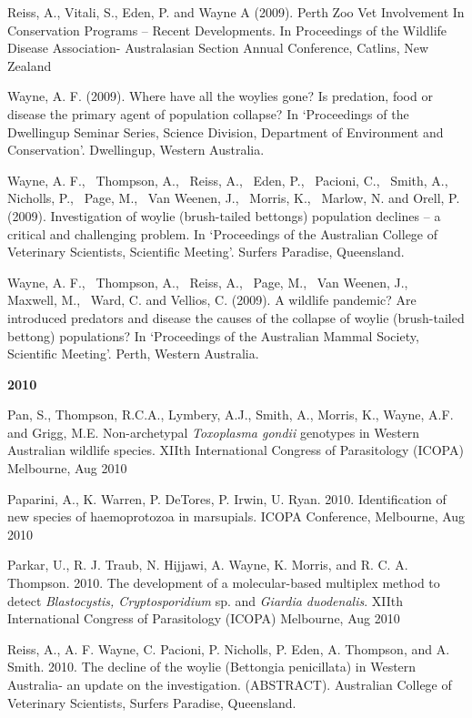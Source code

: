\documentclass[version=last,
    paper=a4,                               %
    10pt,                                   %
    dvipsnames,
    oneside,                              %
    headings=openany,                       %
    open=any,
    BCOR=7mm,                               %
    DIV=15,     %
]{scrbook}
\begin{document}
Reiss, A., Vitali, S., Eden, P. and Wayne A (2009). Perth Zoo Vet
Involvement In Conservation Programs -- Recent Developments. In
Proceedings of the Wildlife Disease Association- Australasian Section
Annual Conference, Catlins, New Zealand

Wayne, A. F. (2009). Where have all the woylies gone? Is predation, food
or disease the primary agent of population collapse? In `Proceedings of
the Dwellingup Seminar Series, Science Division, Department of
Environment and Conservation'. Dwellingup, Western Australia.

Wayne, A. F.,~ Thompson, A.,~ Reiss, A.,~ Eden, P.,~ Pacioni, C.,~
Smith, A.,~ Nicholls, P.,~ Page, M.,~ Van Weenen, J.,~ Morris, K.,~
Marlow, N. and Orell, P. (2009). Investigation of woylie (brush-tailed
bettongs) population declines -- a critical and challenging problem. In
`Proceedings of the Australian College of Veterinary Scientists,
Scientific Meeting'. Surfers Paradise, Queensland.

Wayne, A. F.,~ Thompson, A.,~ Reiss, A.,~ Page, M.,~ Van Weenen, J.,~
Maxwell, M.,~ Ward, C. and Vellios, C. (2009). A wildlife pandemic? Are
introduced predators and disease the causes of the collapse of woylie
(brush-tailed bettong) populations? In `Proceedings of the Australian
Mammal Society, Scientific Meeting'. Perth, Western Australia.

\textbf{2010}

Pan, S., Thompson, R.C.A., Lymbery, A.J., Smith, A., Morris, K., Wayne,
A.F. and Grigg, M.E. Non-archetypal \emph{Toxoplasma gondii} genotypes
in Western Australian wildlife species. XIIth International Congress of
Parasitology (ICOPA) Melbourne, Aug 2010

Paparini, A., K. Warren, P. DeTores, P. Irwin, U. Ryan. 2010.
Identification of new species of haemoprotozoa in marsupials. ICOPA
Conference, Melbourne, Aug 2010

Parkar, U., R. J. Traub, N. Hijjawi, A. Wayne, K. Morris, and R. C. A.
Thompson. 2010. The development of a molecular-based multiplex method to
detect \emph{Blastocystis, Cryptosporidium} sp. and \emph{Giardia
duodenalis}. XIIth International Congress of Parasitology (ICOPA)
Melbourne, Aug 2010

Reiss, A., A. F. Wayne, C. Pacioni, P. Nicholls, P. Eden, A. Thompson,
and A. Smith. 2010. The decline of the woylie (Bettongia penicillata) in
Western Australia- an update on the investigation. (ABSTRACT).
Australian College of Veterinary Scientists, Surfers Paradise,
Queensland.
\end{document}
